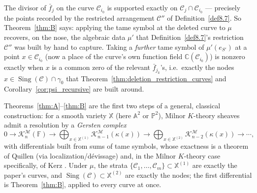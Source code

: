 \documentclass[article,11pt]{amsart} \numberwithin{equation}{section}
\numberwithin{equation}{section}
\begin{document}
{\begin{rk}
	\label{rem:nodes}
	The divisor of $\bar f_j$ on the curve $\mathscr C_{i_0}$ is supported exactly on
	$\mathscr C_j\cap \mathscr C_{i_0}$ --- precisely the points recorded by the restricted
	arrangement $\mathcal C''$ of Definition~\ref{def8.7}. So Theorem~\ref{thm:B} says:
	applying the tame symbol at the deleted curve to $\mu$ recovers, on the
	nose, the algebraic data $\mu'$ that Definition~\ref{def8.7}'s restriction
	$\mathcal C''$ was built by hand to capture. Taking a \emph{further} tame
	symbol of $\mu'(e_{S'})$ at a point $x\in \mathscr C_{i_0}$ (now a place of the
	curve's own function field $\mathbb C(\mathscr C_{i_0})$) is nonzero exactly when $x$ is a
	common zero of the relevant $\bar f_{j_k}$'s, i.e.\ exactly the nodes
	$x\in\operatorname{Sing}(\mathcal C)\cap\gamma_0$ that Theorem~\ref{thm:deletion_restriction_curves} and Corollary~\ref{cor:psi_recursive} are
	built around.
\end{rk}

\begin{rk}
	\label{rem:gersten}
	Theorems~\ref{thm:A}--\ref{thm:B} are the first two steps of a general,
	classical construction: for a smooth variety $\mathbb X$ (here $\mathbb A^2$ or
	$\mathbb P^2$), Milnor $K$-theory sheaves admit a resolution by a
	\emph{Gersten complex}
	\[
	0\longrightarrow \mathcal K^\mathcal M_n(\mathbb F)\longrightarrow \bigoplus_{x\in \mathbb X^{(1)}} \mathcal K^\mathcal M_{n-1}(\kappa(x)) \longrightarrow
	\bigoplus_{x\in \mathbb X^{(2)}} \mathcal K^\mathcal M_{n-2}(\kappa(x)) \longrightarrow\cdots,
	\]
	with differentials built from sums of tame symbols, whose exactness is a
	theorem of Quillen (via localization/d\'evissage) and, in the Milnor
	$K$-theory case specifically, of Kerz \cite{Kerz2009,Rost1996}. Under $\mu$,
	the strata $\{\mathscr C_1,\dots,\mathscr C_m\} \subset \mathbb X^{(1)}$ are exactly the paper's
	curves, and $ \operatorname{Sing}(\mathcal C) \subset \mathbb X^{(2)}$ are exactly the nodes; the
	first differential is Theorem~\ref{thm:B}, applied to every curve at once.
	

\end{rk}}
\end{document}
